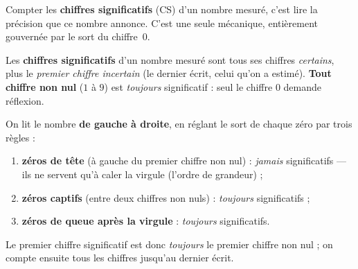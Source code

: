 \documentclass[11pt,a4paper]{article}
\begin{document}

Compter les \textbf{chiffres significatifs} (CS) d'un nombre mesuré, c'est lire la précision
que ce nombre annonce. C'est une seule mécanique, entièrement gouvernée par le sort du chiffre~$0$.

\begin{cle}
Les \textbf{chiffres significatifs} d'un nombre mesuré sont tous ses chiffres \emph{certains}, plus le
\emph{premier chiffre incertain} (le dernier écrit, celui qu'on a estimé). \textbf{Tout chiffre non nul}
($1$ à $9$) est \emph{toujours} significatif : seul le chiffre $0$ demande réflexion.
\end{cle}

\begin{methode}
On lit le nombre \textbf{de gauche à droite}, en réglant le sort de chaque zéro par trois règles :
\begin{enumerate}[label=\arabic*.,leftmargin=1.8em,topsep=2pt,itemsep=1.5pt]
  \item \textbf{zéros de tête} (à gauche du premier chiffre non nul) : \emph{jamais} significatifs ---
        ils ne servent qu'à caler la virgule (l'ordre de grandeur) ;
  \item \textbf{zéros captifs} (entre deux chiffres non nuls) : \emph{toujours} significatifs ;
  \item \textbf{zéros de queue après la virgule} : \emph{toujours} significatifs.
\end{enumerate}
Le premier chiffre significatif est donc \emph{toujours} le premier chiffre non nul ; on compte
ensuite tous les chiffres jusqu'au dernier écrit.
\end{methode}
\end{document}
